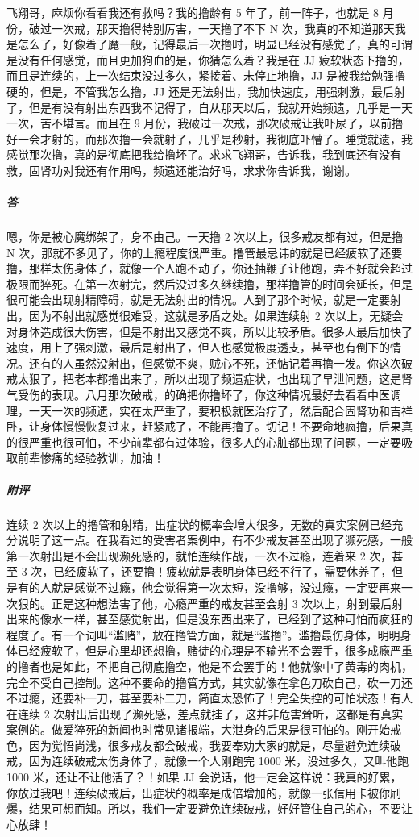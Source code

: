 \begin{case}
    飞翔哥，麻烦你看看我还有救吗？我的撸龄有 5 年了，前一阵子，也就是 8 月份，破过一次戒，那天撸得特别厉害，一天撸了不下 N 次，我真的不知道那天我是怎么了，好像着了魔一般，记得最后一次撸时，明显已经没有感觉了，真的可谓是没有任何感觉，而且更加狗血的是，你猜怎么着？我是在 JJ 疲软状态下撸的，而且是连续的，上一次结束没过多久，紧接着、未停止地撸，JJ 是被我给勉强撸硬的，但是，不管我怎么撸，JJ 还是无法射出，我加快速度，用强刺激，最后射了，但是有没有射出东西我不记得了，自从那天以后，我就开始频遗，几乎是一天一次，苦不堪言。而且在 9 月份，我破过一次戒，那次破戒让我吓尿了，以前撸好一会才射的，而那次撸一会就射了，几乎是秒射，我彻底吓懵了。睡觉就遗，我感觉那次撸，真的是彻底把我给撸坏了。求求飞翔哥，告诉我，我到底还有没有救，固肾功对我还有作用吗，频遗还能治好吗，求求你告诉我，谢谢。
    \subparagraph{答} 嗯，你是被心魔绑架了，身不由己。一天撸 2 次以上，很多戒友都有过，但是撸 N 次，那就不多见了，你的上瘾程度很严重。撸管最忌讳的就是已经疲软了还要撸，那样太伤身体了，就像一个人跑不动了，你还抽鞭子让他跑，弄不好就会超过极限而猝死。在第一次射完，然后没过多久继续撸，那样撸管的时间会延长，但是很可能会出现射精障碍，就是无法射出的情况。人到了那个时候，就是一定要射出，因为不射出就感觉很难受，这就是矛盾之处。如果连续射 2 次以上，无疑会对身体造成很大伤害，但是不射出又感觉不爽，所以比较矛盾。很多人最后加快了速度，用上了强刺激，最后是射出了，但人也感觉极度透支，甚至也有倒下的情况。还有的人虽然没射出，但感觉不爽，贼心不死，还惦记着再撸一发。你这次破戒太狠了，把老本都撸出来了，所以出现了频遗症状，也出现了早泄问题，这是肾气受伤的表现。八月那次破戒，的确把你撸坏了，你这种情况最好去看看中医调理，一天一次的频遗，实在太严重了，要积极就医治疗了，然后配合固肾功和吉祥卧，让身体慢慢恢复过来，赶紧戒了，不能再撸了。切记！不要命地疯撸，后果真的很严重也很可怕，不少前辈都有过体验，很多人的心脏都出现了问题，一定要吸取前辈惨痛的经验教训，加油！
    \subparagraph{附评} 连续 2 次以上的撸管和射精，出症状的概率会增大很多，无数的真实案例已经充分说明了这一点。在我看过的受害者案例中，有不少戒友甚至出现了濒死感，一般第一次射出是不会出现濒死感的，就怕连续作战，一次不过瘾，连着来 2 次，甚至 3 次，已经疲软了，还要撸！疲软就是表明身体已经不行了，需要休养了，但是有的人就是感觉不过瘾，他会觉得第一次太短，没撸够，没过瘾，一定要再来一次狠的。正是这种想法害了他，心瘾严重的戒友甚至会射 3 次以上，射到最后射出来的像水一样，甚至感觉射出，但是没东西出来了，已经到了这种可怕而疯狂的程度了。有一个词叫“滥赌”，放在撸管方面，就是“滥撸”。滥撸最伤身体，明明身体已经疲软了，但是心里却还想撸，赌徒的心理是不输光不会罢手，很多成瘾严重的撸者也是如此，不把自己彻底撸空，他是不会罢手的！他就像中了黄毒的肉机，完全不受自己控制。这种不要命的撸管方式，其实就像在拿色刀砍自己，砍一刀还不过瘾，还要补一刀，甚至要补二刀，简直太恐怖了！完全失控的可怕状态！有人在连续 2 次射出后出现了濒死感，差点就挂了，这并非危害耸听，这都是有真实案例的。做爱猝死的新闻也时常见诸报端，大泄身的后果是很可怕的。刚开始戒色，因为觉悟尚浅，很多戒友都会破戒，我要奉劝大家的就是，尽量避免连续破戒，因为连续破戒太伤身体了，就像一个人刚跑完 1000 米，没过多久，又叫他跑 1000 米，还让不让他活了？！如果 JJ 会说话，他一定会这样说：我真的好累，你放过我吧！连续破戒后，出症状的概率是成倍增加的，就像一张信用卡被你刷爆，结果可想而知。所以，我们一定要避免连续破戒，好好管住自己的心，不要让心放肆！
\end{case}

